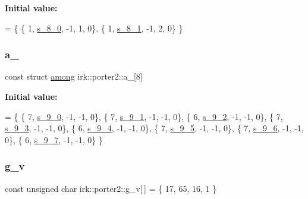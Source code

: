 {\bfseries Initial value\+:}
\begin{DoxyCode}
=
\{
 \{ 1, \mbox{\hyperlink{namespaceirk_1_1porter2_a11dd59c08c3cf44465ad15ff372e47f8}{s\_8\_0}}, -1, 1, 0\},
 \{ 1, \mbox{\hyperlink{namespaceirk_1_1porter2_a5963461ea33ac29931deefcfee6eb61d}{s\_8\_1}}, -1, 2, 0\}
\}
\end{DoxyCode}
\mbox{\label{namespaceirk_1_1porter2_a50971698a728000b26a3c28833842f5b}} 
\subsubsection{\texorpdfstring{a\+\_}{a\_9}}
{\footnotesize\ttfamily const struct \mbox{\hyperlink{structirk_1_1porter2_1_1among}{among}} irk\+::porter2\+::a\+\_\mbox{[}8\mbox{]}\hspace{0.3cm}{\ttfamily [static]}}

{\bfseries Initial value\+:}
\begin{DoxyCode}
=
\{
 \{ 7, \mbox{\hyperlink{namespaceirk_1_1porter2_abc7eb2cc1e44236d34d4df82a63ae9b8}{s\_9\_0}}, -1, -1, 0\},
 \{ 7, \mbox{\hyperlink{namespaceirk_1_1porter2_a9181c7bd92b52358dbd82932858d4859}{s\_9\_1}}, -1, -1, 0\},
 \{ 6, \mbox{\hyperlink{namespaceirk_1_1porter2_a8bd82e00fa91a26ec105506548ae6f6a}{s\_9\_2}}, -1, -1, 0\},
 \{ 7, \mbox{\hyperlink{namespaceirk_1_1porter2_a90edb93a0d0bcb648a498387b1ffcbf8}{s\_9\_3}}, -1, -1, 0\},
 \{ 6, \mbox{\hyperlink{namespaceirk_1_1porter2_a9c1bde00e13c37049ad9b00e51f1274b}{s\_9\_4}}, -1, -1, 0\},
 \{ 7, \mbox{\hyperlink{namespaceirk_1_1porter2_a73ade7498df6545e2daf9c47db1296f9}{s\_9\_5}}, -1, -1, 0\},
 \{ 7, \mbox{\hyperlink{namespaceirk_1_1porter2_af55018b3afb6e3a4668093586de6d0a1}{s\_9\_6}}, -1, -1, 0\},
 \{ 6, \mbox{\hyperlink{namespaceirk_1_1porter2_af668a90d0e607e7705fe3de2e851f298}{s\_9\_7}}, -1, -1, 0\}
\}
\end{DoxyCode}
\mbox{\label{namespaceirk_1_1porter2_a27da03adfd637625df52babe7816c985}} 
\subsubsection{\texorpdfstring{g\+\_\+v}{g\_v}}
{\footnotesize\ttfamily const unsigned char irk\+::porter2\+::g\+\_\+v\mbox{[}$\,$\mbox{]} = \{ 17, 65, 16, 1 \}\hspace{0.3cm}{\ttfamily [static]}}

